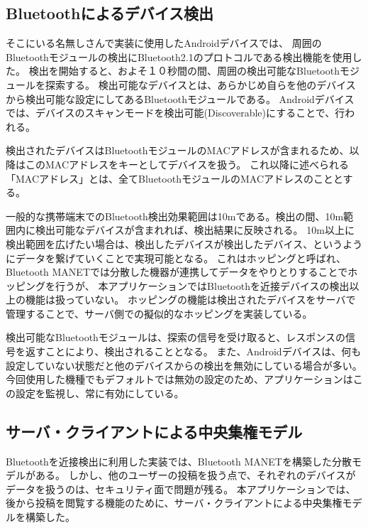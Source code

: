 \newpage

\subsection{Bluetoothによるデバイス検出}

そこにいる名無しさんで実装に使用したAndroidデバイスでは、
周囲のBluetoothモジュールの検出にBluetooth2.1のプロトコルである検出機能を使用した。
検出を開始すると、およそ１０秒間の間、周囲の検出可能なBluetoothモジュールを探索する。
検出可能なデバイスとは、あらかじめ自らを他のデバイスから検出可能な設定にしてあるBluetoothモジュールである。
Androidデバイスでは、デバイスのスキャンモードを検出可能(Discoverable)にすることで、行われる。

検出されたデバイスはBluetoothモジュールのMACアドレスが含まれるため、以降はこのMACアドレスをキーとしてデバイスを扱う。
これ以降に述べられる「MACアドレス」とは、全てBluetoothモジュールのMACアドレスのこととする。

一般的な携帯端末でのBluetooth検出効果範囲は10mである。検出の間、10m範囲内に検出可能なデバイスが含まれれば、検出結果に反映される。
10m以上に検出範囲を広げたい場合は、検出したデバイスが検出したデバイス、というようにデータを繋げていくことで実現可能となる。
これはホッピングと呼ばれ、Bluetooth MANETでは分散した機器が連携してデータをやりとりすることでホッピングを行うが、
本アプリケーションではBluetoothを近接デバイスの検出以上の機能は扱っていない。
ホッピングの機能は検出されたデバイスをサーバで管理することで、サーバ側での擬似的なホッピングを実装している。

検出可能なBluetoothモジュールは、探索の信号を受け取ると、レスポンスの信号を返すことにより、検出されることとなる。
また、Androidデバイスは、何も設定していない状態だと他のデバイスからの検出を無効にしている場合が多い。
今回使用した機種でもデフォルトでは無効の設定のため、アプリケーションはこの設定を監視し、常に有効にしている。


\subsection{サーバ・クライアントによる中央集権モデル}

Bluetoothを近接検出に利用した実装では、Bluetooth MANETを構築した分散モデルがある。
しかし、他のユーザーの投稿を扱う点で、それぞれのデバイスがデータを扱うのは、セキュリティ面で問題が残る。
\cite{Lentz:2014:SLS:2671225.2671284}
本アプリケーションでは、後から投稿を閲覧する機能のために、サーバ・クライアントによる中央集権モデルを構築した。


